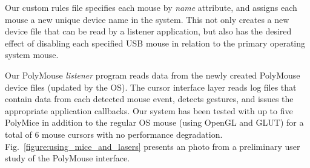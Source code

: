 \documentclass[runningheads,a4paper]{llncs}
\begin{document}
Our custom rules file
specifies each mouse by {\em name} attribute, and assigns each
mouse a new unique device name in the
system.
This not only creates a new device file that can be read by a listener
application, but also has the desired effect of disabling each specified USB
mouse in relation to the primary operating system mouse. 

Our PolyMouse {\em listener} program reads data from the newly
created PolyMouse device files
(updated by the OS). 
The cursor interface layer reads log files
that contain data from each detected mouse event, 
detects gestures, and
issues the appropriate application callbacks.  
Our system has been tested with up to 
five PolyMice in addition to the regular OS mouse (using OpenGL and
GLUT) for a total of 6 mouse cursors with no performance degradation.
Fig.~\ref{figure:using_mice_and_lasers} presents an photo from a
preliminary user study of the PolyMouse interface.

\end{document}
